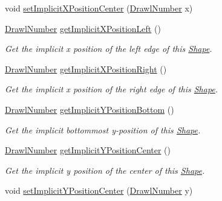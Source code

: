 \begin{DoxyCompactItemize}
void \hyperlink{classcom_1_1aarrelaakso_1_1drawl_1_1_shape_a58226399cee0d166f45e807869af0bc8}{set\+Implicit\+X\+Position\+Center} (\hyperlink{classcom_1_1aarrelaakso_1_1drawl_1_1_drawl_number}{Drawl\+Number} x)
\item 
\hyperlink{classcom_1_1aarrelaakso_1_1drawl_1_1_drawl_number}{Drawl\+Number} \hyperlink{classcom_1_1aarrelaakso_1_1drawl_1_1_shape_a3cc59779e8ce4a98ff2309e0fb414527}{get\+Implicit\+X\+Position\+Left} ()
\begin{DoxyCompactList}\small\item\em Get the implicit x position of the left edge of this \hyperlink{classcom_1_1aarrelaakso_1_1drawl_1_1_shape}{Shape}. \end{DoxyCompactList}\item 
\hyperlink{classcom_1_1aarrelaakso_1_1drawl_1_1_drawl_number}{Drawl\+Number} \hyperlink{classcom_1_1aarrelaakso_1_1drawl_1_1_shape_aedcaf32e6be1114111e5ee2ddb1214a3}{get\+Implicit\+X\+Position\+Right} ()
\begin{DoxyCompactList}\small\item\em Get the implicit x position of the right edge of this \hyperlink{classcom_1_1aarrelaakso_1_1drawl_1_1_shape}{Shape}. \end{DoxyCompactList}\item 
\hyperlink{classcom_1_1aarrelaakso_1_1drawl_1_1_drawl_number}{Drawl\+Number} \hyperlink{classcom_1_1aarrelaakso_1_1drawl_1_1_shape_af04961079cb3993d8f73670e6695415b}{get\+Implicit\+Y\+Position\+Bottom} ()
\begin{DoxyCompactList}\small\item\em Get the implicit bottommost y-\/position of this \hyperlink{classcom_1_1aarrelaakso_1_1drawl_1_1_shape}{Shape}. \end{DoxyCompactList}\item 
\hyperlink{classcom_1_1aarrelaakso_1_1drawl_1_1_drawl_number}{Drawl\+Number} \hyperlink{classcom_1_1aarrelaakso_1_1drawl_1_1_shape_a0549739ee3201ae16091acce4ee6a5ac}{get\+Implicit\+Y\+Position\+Center} ()
\begin{DoxyCompactList}\small\item\em Get the implicit y position of the center of this \hyperlink{classcom_1_1aarrelaakso_1_1drawl_1_1_shape}{Shape}. \end{DoxyCompactList}\item 
void \hyperlink{classcom_1_1aarrelaakso_1_1drawl_1_1_shape_ac49fa20747ea798a3b56c3ea99df2d8f}{set\+Implicit\+Y\+Position\+Center} (\hyperlink{classcom_1_1aarrelaakso_1_1drawl_1_1_drawl_number}{Drawl\+Number} y)

\end{DoxyCompactItemize}
